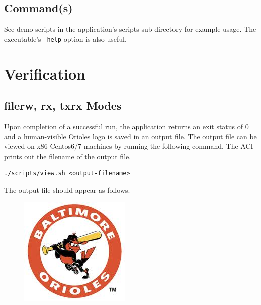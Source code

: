   \subsection{Command(s)}

    See demo scripts in the application's scripts
    sub-directory\cite{github_scripts_dir}
    for example
    usage. The executable's \texttt{--help} option is also useful.

\section{Verification}

  \subsection{filerw, rx, txrx Modes}
    Upon completion of a successful run, the application returns an exit status
    of
    0
    and a human-visible Orioles logo is saved in an output file. The output file
    can
    be viewed on x86 Centos6/7 machines by running the following command. The
    ACI
    prints out the filename of the output file.
    \begin{lstlisting}
./scripts/view.sh <output-filename>
    \end{lstlisting}
    \noindent The output file should appear as follows.
    \begin{center}
      \begin{figure}[h]
        \centering\captionsetup{type=figure}\includegraphics[scale=0.6]{os}
        \label{fig:blockdiagram}
      \end{figure}
    \end{center}

